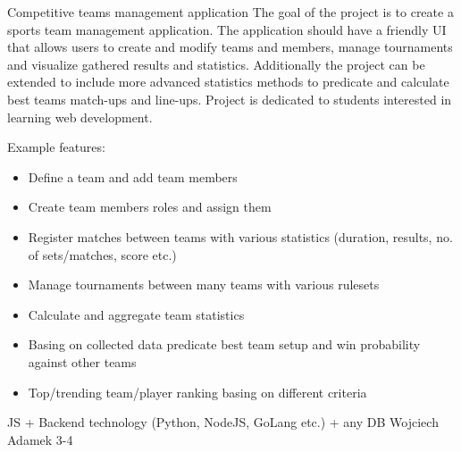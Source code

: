 \begin{project}
{Competitive teams management application}
{
The goal of the project is to create a sports team management application. The application should have a friendly UI that allows users to create and modify teams and members, manage tournaments and visualize gathered results and statistics. Additionally the project can be extended to include more advanced statistics methods to predicate and calculate best teams match-ups and line-ups. Project is dedicated to students interested in learning web development. 
}
{
Example features:
\begin{itemize}
	\item Define a team and add team members
	\item Create team members roles and assign them
	\item Register matches between teams with various statistics (duration, results, no. of sets/matches, score etc.)
	\item Manage tournaments between many teams with various rulesets
	\item Calculate and aggregate team statistics
	\item Basing on collected data predicate best team setup and win probability against other teams
	\item Top/trending team/player ranking basing on different criteria
\end{itemize}
}
{
JS + Backend technology (Python, NodeJS, GoLang etc.) + any DB
}
{Wojciech Adamek}
{3-4}
\end{project}
